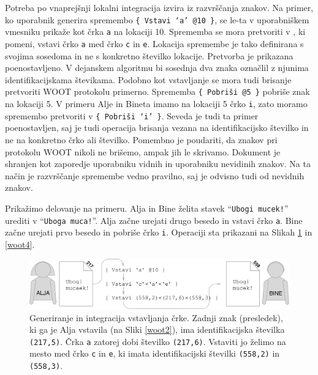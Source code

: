 \documentclass[a4paper, 12pt, twoside]{book}
\begin{document}
Potreba po vnaprejšnji lokalni integracija izvira iz razvrščanja znakov. Na primer, ko uporabnik generira spremembo {\tt \{ Vstavi ‘a’ @10 \}}, se le-ta v uporabniškem vmesniku prikaže kot črka {\tt a} na lokaciji 10. Sprememba se mora pretvoriti v , ki pomeni, vstavi črko {\tt a} med črko {\tt c} in {\tt e}. Lokacija spremembe je tako definirana s svojima sosedoma in ne s konkretno številko lokacije. Pretvorba je prikazana poenostavljeno. V dejanskem algoritmu bi sosednja dva znaka označlil z njunima identifikacijskama števikama. Podobno kot vstavljanje se mora tudi brisanje pretvoriti WOOT protokolu primerno. Sprememba {\tt \{ Pobriši @5 \}} pobriše znak na lokaciji 5. V primeru Alje in Bineta imamo na lokaciji 5 črko {\tt i}, zato moramo spremembo pretvoriti v {\tt \{ Pobriši ‘i’ \}}. Seveda je tudi ta primer poenostavljen, saj je tudi operacija brisanja vezana na identifikacijsko številko in ne na konkretno črko ali številko. Pomembno je poudariti, da znakov pri protokolu WOOT nikoli ne brišemo, ampak jih le skrivamo. Dokument je shranjen kot zaporedje uporabniku vidnih in uporabniku nevidinih znakov. Na ta način je razvrščanje spremembe vedno pravilno, saj je odvisno tudi od nevidnih znakov.

Prikažimo delovanje na primeru. Alja in Bine želita stavek “{\tt Ubogi mucek!}” urediti v “{\tt Uboga muca!}”. Alja začne urejati drugo besedo in vstavi črko {\tt a}. Bine začne urejati prvo besedo in pobriše črko {\tt i}. Operaciji sta prikazani na Slikah \ref{woot3} in \ref{woot4}.

\begin{figure}[placement h]
\begin{center}
\includegraphics[width=16cm]{img/woot3.pdf}
\end{center}
\caption{Generiranje in integracija vstavljanja črke. Zadnji znak (presledek), ki ga je Alja vstavila (na Sliki \ref{woot2}), ima identifikacijska številka {\tt (217,5)}. Črka {\tt a} zatorej dobi številko {\tt (217,6)}. Vstaviti jo želimo na mesto med črko {\tt c} in {\tt e}, ki imata identifikacijski številki {\tt (558,2)} in {\tt (558,3)}.}
\label{woot3}
\end{figure}
\end{document}
